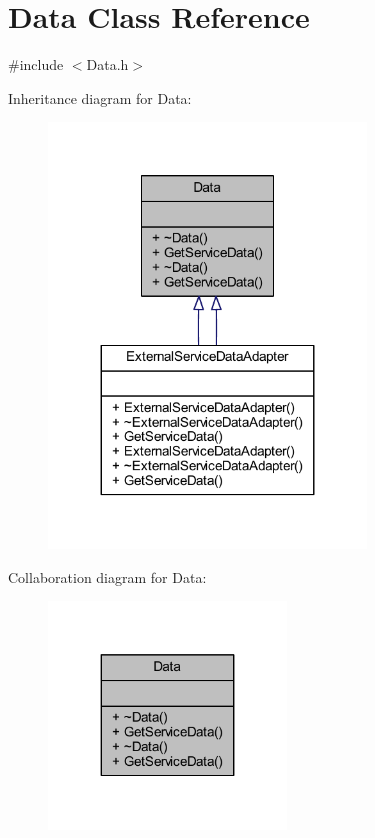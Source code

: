 \hypertarget{class_data}{}\section{Data Class Reference}
\label{class_data}


{\ttfamily \#include $<$Data.\+h$>$}



Inheritance diagram for Data\+:
\nopagebreak
\begin{figure}[H]
\begin{center}
\leavevmode
\includegraphics[width=239pt]{class_data__inherit__graph}
\end{center}
\end{figure}


Collaboration diagram for Data\+:
\nopagebreak
\begin{figure}[H]
\begin{center}
\leavevmode
\includegraphics[width=179pt]{class_data__coll__graph}
\end{center}
\end{figure}
